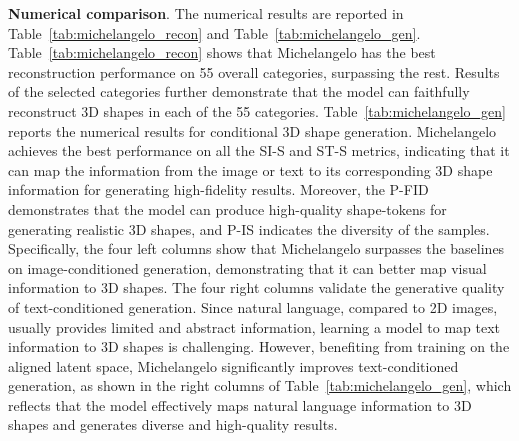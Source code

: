 \documentclass[../../book-main.tex]{subfiles}
\begin{document}
\textbf{Numerical comparison}.
The numerical results are reported in
Table~\ref{tab:michelangelo_recon} and Table~\ref{tab:michelangelo_gen}.
Table~\ref{tab:michelangelo_recon} shows that Michelangelo has the
best reconstruction performance on 55 overall categories, surpassing
the rest. Results of the selected categories further demonstrate that
the model can faithfully reconstruct 3D shapes in each of the 55 categories.
Table~\ref{tab:michelangelo_gen} reports the numerical results for
conditional 3D shape generation.
Michelangelo achieves the best performance on all the SI-S and ST-S
metrics, indicating that it can map the information from the image or
text to its corresponding 3D shape information for generating
high-fidelity results. Moreover, the P-FID demonstrates that the
model can produce high-quality shape-tokens for generating realistic
3D shapes, and P-IS indicates the diversity of the samples.
Specifically, the four left columns show that Michelangelo surpasses
the baselines on image-conditioned generation, demonstrating that it
can better map visual information to 3D shapes.
The four right columns validate the generative quality of
text-conditioned generation. Since natural language, compared to 2D
images, usually provides limited and abstract information, learning a
model to map text information to 3D shapes is challenging. However,
benefiting from training on the aligned latent space, Michelangelo
significantly improves text-conditioned generation, as shown in the
right columns of Table~\ref{tab:michelangelo_gen}, which reflects
that the model effectively maps natural language information to 3D
shapes and generates diverse and high-quality results.
\end{document}
